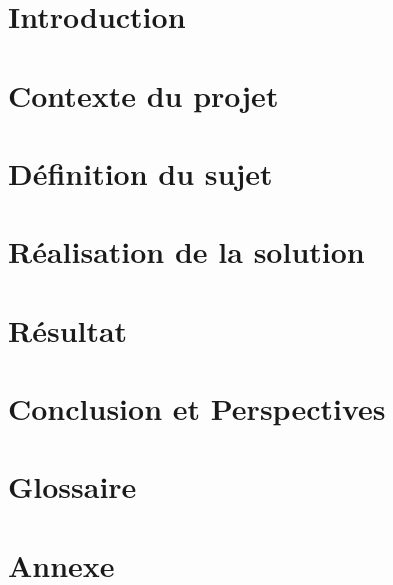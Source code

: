 \documentclass[a4paper, oneside, 12pt, final]{extreport}
\begin{document}
\newpage
{}
\chapter*{Introduction}
\label{chap:Introduction}
{\fontsize{14pt}{16pt}\selectfont
    
}


\chapter{Contexte du projet}%
\label{chap:Contexte du projet}


\chapter{Définition du sujet}%
\label{chap:2}


\chapter{Réalisation de la solution}%
\label{chap:3}


\chapter{Résultat}%
\label{chap:4}


\chapter*{Conclusion et Perspectives}
\label{chap:conclusion}
{\fontsize{14pt}{16pt}\selectfont
    
}

\chapter*{Glossaire}
\label{chap:glossaire}


\newpage
\appendix

\chapter*{Annexe}
\label{chap:Annexe}


\nocite{*}




\label{biblio}

\cleardoublepage%


\printglossaries
\printindex

%
\end{document}
